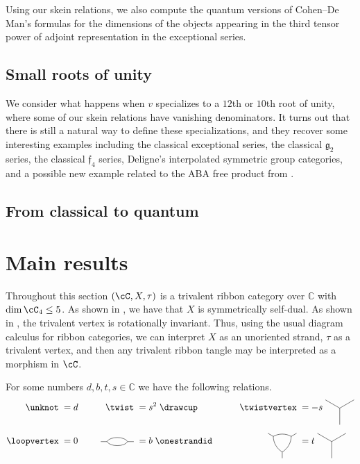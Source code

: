 \documentclass[12pt]{amsart}
\begin{document}
Using our skein relations, we also compute the quantum versions of Cohen--De
Man's formulas for the dimensions of the objects appearing in the third tensor
power of adjoint representation in the exceptional series.

\subsection{Small roots of unity}


We consider what happens when $v$ specializes to a $12$th or $10$th
root of unity, where some of our skein relations have vanishing denominators.
It turns out that there is still a natural way to define these
specializations, and they recover some interesting examples including the
classical exceptional series, the classical $\mathfrak{g}_2$ series, the
classical $\mathfrak{f}_4$ series, Deligne's interpolated symmetric group
categories, and a possible new example related to the ABA free product from
\cite{MR3624901}.

\subsection{From classical to quantum}


\section{Main results}

Throughout this section $(\cC, X, \tau)$ is a trivalent ribbon category over $\mathbb{C}$ with $\dim{\cC_4} \leq 5$.  As shown in \cite[Lemma 2.2]{MR3624901}, we have that $X$ is symmetrically self-dual.  As shown in \cite[Lemma 8.2]{MR3624901}, the trivalent vertex is rotationally invariant.  Thus, using the usual diagram calculus for ribbon categories, we can interpret $X$ as an unoriented strand, $\tau$ as a trivalent vertex, and then any trivalent ribbon tangle may be interpreted as a morphism in $\cC$.

\begin{lemma} \label{lem:constants}
  For some numbers $d, b, t, s \in \mathbb{C}$ we have the following relations.
  \begin{equation}
    \label{eq:simple-rels}
  \begin{aligned}
    \unknot\; &= d&\qquad
      \twist\; &= s^2\;\drawcup&\qquad
        \twistvertex\; &= -s\;\nvertex[-90]{3}\\[5pt]
    \loopvertex\;&=0&
      \ngon{2}\;&= b\;\onestrandid&
        \ngon[-90]{3}\; &= t\;\nvertex[-90]{3}
  \end{aligned}
  \end{equation}
\end{lemma}
\end{document}

